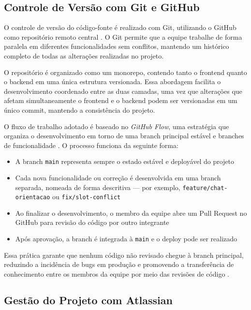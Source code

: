 \subsection{Controle de Versão com Git e GitHub}
\label{subsec:version-control}

O controle de versão do código-fonte é realizado com
Git, utilizando o GitHub como repositório remoto
central \cite{chacon2014}. O Git permite que a equipe
trabalhe de forma paralela em diferentes funcionalidades
sem conflitos, mantendo um histórico completo de todas
as alterações realizadas no projeto.

O repositório é organizado como um monorepo, contendo
tanto o frontend quanto o backend em uma única estrutura
versionada. Essa abordagem facilita o desenvolvimento
coordenado entre as duas camadas, uma vez que alterações
que afetam simultaneamente o frontend e o backend podem
ser versionadas em um único commit, mantendo a
consistência do projeto.

O fluxo de trabalho adotado é baseado no
\textit{GitHub Flow}, uma estratégia que organiza o
desenvolvimento em torno de uma branch principal estável
e branches de funcionalidade \cite{chacon2014}. O
processo funciona da seguinte forma:

\begin{itemize}
  \item A branch \texttt{main} representa sempre o
        estado estável e deployável do projeto
  \item Cada nova funcionalidade ou correção é
        desenvolvida em uma branch separada, nomeada
        de forma descritiva — por exemplo,
        \texttt{feature/chat-orientacao} ou
        \texttt{fix/slot-conflict}
  \item Ao finalizar o desenvolvimento, o membro da
        equipe abre um Pull Request no GitHub para
        revisão do código por outro integrante
  \item Após aprovação, a branch é integrada à
        \texttt{main} e o deploy pode ser realizado
\end{itemize}

Essa prática garante que nenhum código não revisado
chegue à branch principal, reduzindo a incidência de
bugs em produção e promovendo a transferência de
conhecimento entre os membros da equipe por meio das
revisões de código \cite{chacon2014}.

\subsection{Gestão do Projeto com Atlassian}
\label{subsec:atlassian}

